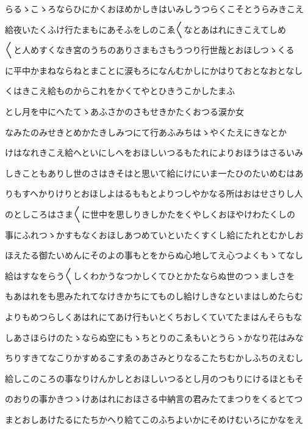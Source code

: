 \documentclass[a4paper,11pt,landscape]{ltjtarticle}
\begin{document}
\par\medskip
らるゝこゝろならひにかくおほめかしきはいみしうつらくこそとうらみきこえ
\par\medskip
給夜いたくふけ行たまもにあそふをしのこゑ〱なとあはれにきこえてしめ
\par\medskip
〱と人めすくなき宮のうちのありさまもさもうつり行世哉とおほしつゝくる
\par\medskip
に平中かまねならねとまことに涙もろになんむかしにかはりておとなおとなし
\par\medskip
くはきこえ給ものからこれをかくてやとひきうこかしたまふ
\par\medskip
とし月を中にへたてゝあふさかのさもせきかたくおつる涙か女
\par\medskip
なみたのみせきとめかたきしみつにて行あふみちはゝやくたえにきなとか
\par\medskip
けはなれきこえ給へといにしへをおほしいつるもたれによりおほうはさるいみ
\par\medskip
しきこともありし世のさはきそはと思いて給にけにいま一たひのたいめむはあ
\par\medskip
りもすへかりけりとおほしよはるももとよりつしやかなる所はおはせさりし人
\par\medskip
のとしころはさま〱に世中を思しりきしかたをくやしくおほやけわたくしの
\par\medskip
事にふれつゝかすもなくおほしあつめていといたくすくし給にたれとむかしお
\par\medskip
ほえたる御たいめんにそのよの事もとをからぬ心地してえ心つよくもゝてなし
\par\medskip
給はすなをらう〱しくわかうなつかしくてひとかたならぬ世のつゝましさを
\par\medskip
もあはれをも思みたれてなけきかちにてものし給けしきなといまはしめたらむ
\par\medskip
よりもめつらしくあはれにてあけ行もいとくちおしくていてたまはんそらもな
\par\medskip
しあさほらけのたゝならぬ空にもゝちとりのこゑもいとうらゝかなり花はみな
\par\medskip
ちりすきてなこりかすめるこすゑのあさみとりなるこたちむかしふちのえむし
\par\medskip
給しこのころの事なりけんかしとおほしいつるとし月のつもりにけるほともそ
\par\medskip
のおりの事かきつゝけあはれにおほさる中納言の君みたてまつりをくるとてつ
\par\medskip
まとおしあけたるにたちかへり給てこのふちよいかにそめけむいろにかなをえ
\par\medskip
\end{document}
